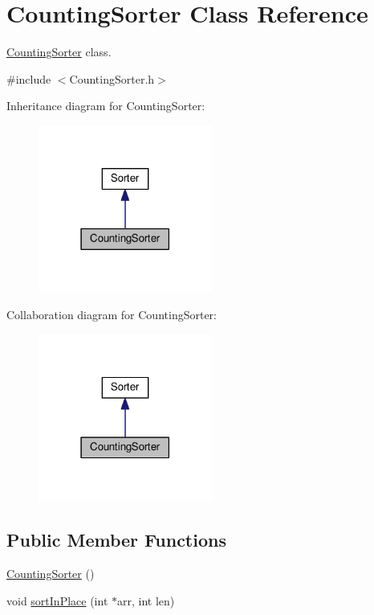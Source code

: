 \hypertarget{class_counting_sorter}{}\section{Counting\+Sorter Class Reference}
\label{class_counting_sorter}


\hyperlink{class_counting_sorter}{Counting\+Sorter} class.  




{\ttfamily \#include $<$Counting\+Sorter.\+h$>$}



Inheritance diagram for Counting\+Sorter\+:
\nopagebreak
\begin{figure}[H]
\begin{center}
\leavevmode
\includegraphics[width=162pt]{class_counting_sorter__inherit__graph}
\end{center}
\end{figure}


Collaboration diagram for Counting\+Sorter\+:
\nopagebreak
\begin{figure}[H]
\begin{center}
\leavevmode
\includegraphics[width=162pt]{class_counting_sorter__coll__graph}
\end{center}
\end{figure}
\subsection*{Public Member Functions}
\begin{DoxyCompactItemize}
\item 
\hyperlink{class_counting_sorter_ad59c68b3b3190319c49a595b1cba86b7}{Counting\+Sorter} ()
\item 
void \hyperlink{class_counting_sorter_adcfc7504df3cd6e0f398a3f064bc01bc}{sort\+In\+Place} (int $\ast$arr, int len)
\end{DoxyCompactItemize}
